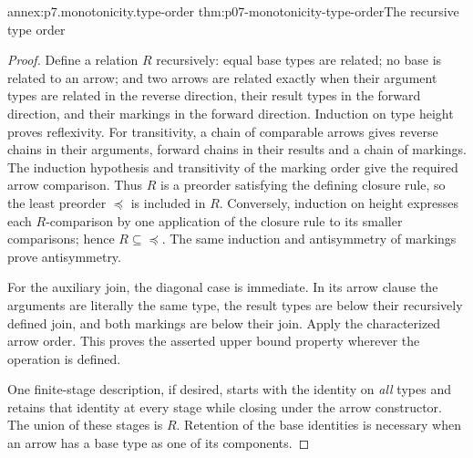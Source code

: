 \begin{annexitem}{annex:p7.monotonicity.type-order}
 {thm:p07-monotonicity-type-order}{The recursive type order}
\begin{proof}
Define a relation \(R\) recursively: equal base types are related; no
base is related to an arrow; and two arrows are related exactly when their
argument types are related in the reverse direction, their result types in
the forward direction, and their markings in the forward direction.
Induction on type height proves reflexivity. For transitivity, a chain
of comparable arrows gives reverse chains in their arguments, forward
chains in their results and a chain of markings. The induction hypothesis
and transitivity of the marking order give the required arrow comparison.
Thus \(R\) is a preorder satisfying the defining closure rule, so the least
preorder \(\preceq\) is included in \(R\).
Conversely, induction on height expresses each \(R\)-comparison by one
application of the closure rule to its smaller comparisons; hence
\(R\subseteq\preceq\).
The same induction and antisymmetry of markings prove antisymmetry.

For the auxiliary join, the diagonal case is immediate. In its arrow
clause the arguments are literally the same type, the result types are
below their recursively defined join, and both markings are below their
join. Apply the characterized arrow order. This proves the asserted upper
bound property wherever the operation is defined.

One finite-stage description, if desired, starts with the identity on
\emph{all} types and retains that identity at every stage while closing
under the arrow constructor. The union of these stages is \(R\).
Retention of the base identities is necessary when an arrow has a base
type as one of its components.
\end{proof}
\end{annexitem}

